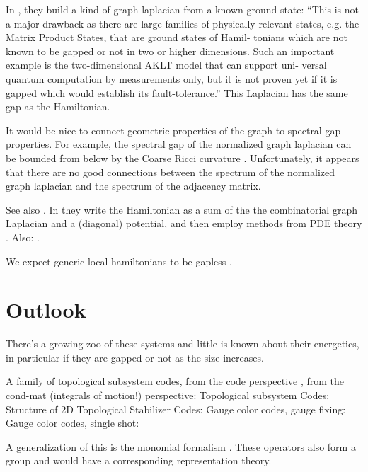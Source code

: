 \documentclass[12pt]{article}
\begin{document}
In \cite{AlShimary2010}, they 
build a kind of graph laplacian from a known ground state:
``This is not a major drawback as there
are large families of physically relevant states, e.g. the
Matrix Product States, that are ground states of Hamil-
tonians which are not known to be gapped or not in two
or higher dimensions. Such an important example is
the two-dimensional AKLT model that can support uni-
versal quantum computation by measurements only, but
it is not proven yet if it is gapped which would establish
its fault-tolerance.''
This Laplacian has the same gap as the Hamiltonian.

It would be nice to connect geometric properties of the
graph to spectral gap properties. For example, the spectral gap of
the normalized graph laplacian can be bounded from below
by the Coarse Ricci curvature \cite{Lin2011}. 
Unfortunately, it appears
that there are no good connections between the spectrum
of the normalized graph laplacian and the spectrum of the adjacency matrix.

See also \cite{Jarret2014,Jarret2015}. 
In \cite{Jarret2015modulus} they
write the Hamiltonian as a sum of the
the combinatorial graph Laplacian and a (diagonal) potential, 
and then employ methods from PDE theory \cite{Andrews2011}.
Also: \cite{Baume2016}. %

We expect generic local hamiltonians to be gapless \cite{Movassagh2016}.

%
%

\section{Outlook}

There's a growing zoo of these systems and little is known
about their energetics, in particular if they are gapped or
not as the size increases.

A family of topological subsystem codes,
from the code perspective  \cite{Bombin2010,Bombin2014,Suchara2011},
from the cond-mat (integrals of motion!) perspective:
\cite{Kargarian2010,Bombin2009}
Topological subsystem Codes: \cite{Suchara2011}
Structure of 2D Topological Stabilizer Codes: \cite{Bombin2014}
Gauge color codes, gauge fixing: \cite{Bombin2015}
Gauge color codes, single shot: \cite{Bombin2015single}

A generalization of this is the 
monomial formalism \cite{Van2011}. 
These operators also form a group and would
have a corresponding representation theory.





{}

\end{document}
